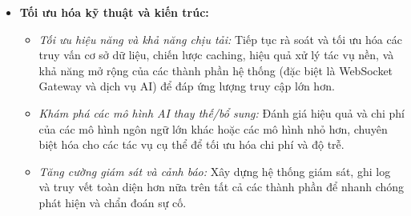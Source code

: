 \begin{itemize}
    \item \textbf{Tối ưu hóa kỹ thuật và kiến trúc:}
        \begin{itemize}
            \item \textit{Tối ưu hiệu năng và khả năng chịu tải:} Tiếp tục rà soát và tối ưu hóa các truy vấn cơ sở dữ liệu, chiến lược caching, hiệu quả xử lý tác vụ nền, và khả năng mở rộng của các thành phần hệ thống (đặc biệt là WebSocket Gateway và dịch vụ AI) để đáp ứng lượng truy cập lớn hơn.
            \item \textit{Khám phá các mô hình AI thay thế/bổ sung:} Đánh giá hiệu quả và chi phí của các mô hình ngôn ngữ lớn khác hoặc các mô hình nhỏ hơn, chuyên biệt hóa cho các tác vụ cụ thể để tối ưu hóa chi phí và độ trễ.
            \item \textit{Tăng cường giám sát và cảnh báo:} Xây dựng hệ thống giám sát, ghi log và truy vết toàn diện hơn nữa trên tất cả các thành phần để nhanh chóng phát hiện và chẩn đoán sự cố.
        \end{itemize}
\end{itemize}

